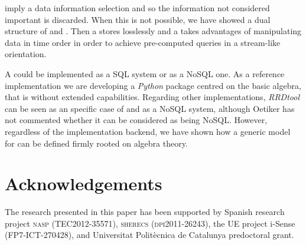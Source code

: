  imply a data information selection and so the information
not considered important is discarded. When this is not possible, we
have showed a dual structure of  and . Then a
 stores losslessly and a  takes advantages of
manipulating data in time order in order to achieve pre-computed
queries in a stream-like orientation.





A  could be implemented as a SQL  system or as
a NoSQL one. As a reference implementation we are developing a
\emph{Python} package centred on the basic algebra, that is without
extended  capabilities. Regarding other implementations,
\emph{RRDtool} can be seen as an specific case of  and as
a NoSQL system, although Oetiker \cite{rrdtool} has not commented
whether it can be considered as being NoSQL. However, regardless of
the implementation backend, we have shown how a generic model for
 can be defined firmly rooted on  algebra
theory.









\section{Acknowledgements}

The research presented in this paper has been supported by Spanish
research project \textsc{nasp (TEC2012-35571)}, \textsc{sherecs
  (dpi2011-26243)}, the UE project i-Sense ({\small FP7-ICT-270428}),
and Universitat Polit\`{e}cnica de Catalunya predoctoral grant.








